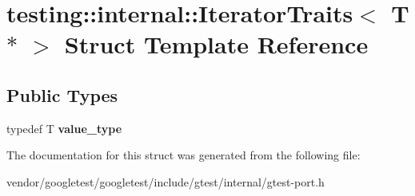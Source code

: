 \hypertarget{structtesting_1_1internal_1_1IteratorTraits_3_01T_01_5_01_4}{}\section{testing\+:\+:internal\+:\+:Iterator\+Traits$<$ T $\ast$ $>$ Struct Template Reference}
\label{structtesting_1_1internal_1_1IteratorTraits_3_01T_01_5_01_4}
\subsection*{Public Types}
\begin{DoxyCompactItemize}
\item 
typedef T {\bfseries value\+\_\+type}\hypertarget{structtesting_1_1internal_1_1IteratorTraits_3_01T_01_5_01_4_a7e46869ed36cc5aea898e243d270a8be}{}\label{structtesting_1_1internal_1_1IteratorTraits_3_01T_01_5_01_4_a7e46869ed36cc5aea898e243d270a8be}

\end{DoxyCompactItemize}


The documentation for this struct was generated from the following file\+:\begin{DoxyCompactItemize}
\item 
vendor/googletest/googletest/include/gtest/internal/gtest-\/port.\+h\end{DoxyCompactItemize}
